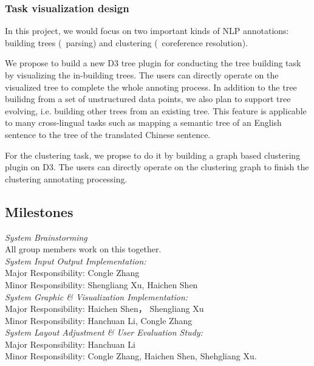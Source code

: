 \subsubsection{Task visualization design}

In this project, we would focus on two important kinds of NLP
annotations: building trees (\eg\  parsing) and clustering (\eg\
coreference resolution). 

We propose to build a new D3 tree plugin for conducting the tree
building task by visualizing the in-building trees. The users can
directly operate on the visualized tree to complete the whole annoting
process.  In addition to the tree builidng from a set of unstructured
data points, we also plan to support tree evolving, i.e. building
other trees from an existing tree. This feature is applicable to many
cross-lingual tasks such as mapping a semantic tree of an English
sentence to the tree of the translated Chinese sentence.

For the clustering task, we propse to do it by building a graph based
clustering plugin on D3. The users can directly operate on the
clustering graph to finish the clustering annotating processing.

\subsection{Milestones}

\emph{System Brainstorming}
\\All group members work on this together.
\\[1\baselineskip]
\emph{System Input Output Implementation:}\\Major Responsibility: Congle Zhang \\Minor Responsibility: Shengliang Xu, Haichen Shen
\\[1\baselineskip]
\emph{System Graphic \& Visualization Implementation:} \\Major Responsibility: Haichen Shen， Shengliang Xu \\Minor Responsibility: Hanchuan Li, Congle Zhang 
\\[1\baselineskip]
\emph{System Layout Adjustment \& User Evaluation Study:} \\Major Responsibility: Hanchuan Li \\ Minor Responsibility: Congle Zhang, Haichen Shen, Shehgliang Xu.
